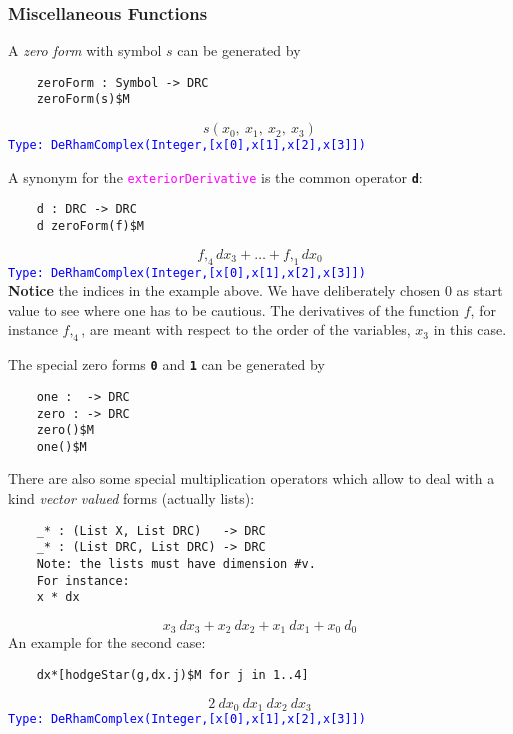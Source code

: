 \documentclass[12pt,a4paper]{article}
\newcommand{\spadfun}[1]{\textcolor{magenta}{\tt #1}}
\newcommand{\spadbold}[1]{{\tt\bf #1}}
\newcommand{\type}[1]{\textcolor{blue}{\tt\tiny #1}}
\begin{document}
\subsubsection{Miscellaneous Functions}
A {\it zero form} with symbol $s$ can be generated by
\begin{lstlisting}
    zeroForm : Symbol -> DRC  
    zeroForm(s)$M
\end{lstlisting}
\begin{displaymath}
	  s
  \left(
   {{x _ {0}}, \: {x _ {1}}, \: {x _ {2}}, \: {x _ {3}}}
  \right)
\end{displaymath}
\type{Type: DeRhamComplex(Integer,[x[0],x[1],x[2],x[3]])}
%

A synonym for the \spadfun{exteriorDerivative} is the common operator 
\spadbold{d}:
\begin{lstlisting}
    d : DRC -> DRC    
    d zeroForm(f)$M
\end{lstlisting}
\begin{displaymath}
   f,_{4} dx_3 + \ldots +  f,_{1} dx_0
\end{displaymath}
\type{Type: DeRhamComplex(Integer,[x[0],x[1],x[2],x[3]])}
\\
{\bf Notice} the indices in the example above. We have deliberately 
chosen $0$ as start value to see where one has to be cautious. The
derivatives of the function $f$, for instance $f,_{4}$, are meant
with respect to the order of the variables, $x_3$ in this case. 
%

The special zero forms \spadbold{0} and \spadbold{1} can be generated 
by
\begin{lstlisting}
    one :  -> DRC
    zero : -> DRC    
    zero()$M
    one()$M
\end{lstlisting}
There are also some special multiplication operators which allow to deal
with a kind {\it vector valued} forms (actually lists):
\begin{lstlisting}
    _* : (List X, List DRC)   -> DRC
    _* : (List DRC, List DRC) -> DRC
    Note: the lists must have dimension #v.    
    For instance:   
    x * dx 
\end{lstlisting}
\begin{displaymath}
 {{x_{3}} \  {dx_{3}}}+{{x_{2}} \  {dx_{2}}}+{{x_{1}} \
  {dx_{1}}}+{{x_{0}} \ {d _{0}}}  
\end{displaymath}
%
An example for the second case:
\begin{lstlisting}
    dx*[hodgeStar(g,dx.j)$M for j in 1..4]
\end{lstlisting}
\begin{displaymath}
    2 \  {dx _ {0}} \  {dx _ {1}} \  {dx _ {2}} \  {dx _ {3}}
\end{displaymath}
\type{Type: DeRhamComplex(Integer,[x[0],x[1],x[2],x[3]])}
%
%
%
\end{document}
